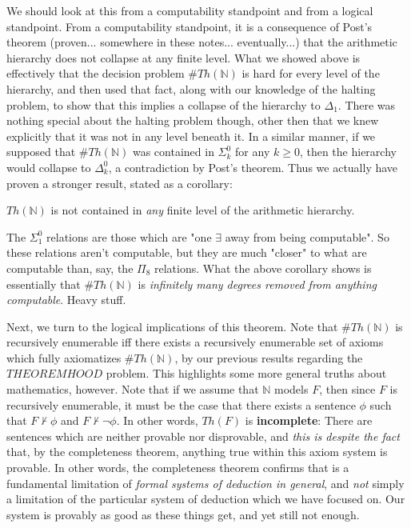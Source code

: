 We should look at this from a computability standpoint and from a logical standpoint. From a computability standpoint, it is a consequence of Post's theorem (proven... somewhere in these notes... eventually...) that the arithmetic hierarchy does not collapse at any finite level. What we showed above is effectively that the decision problem $\#Th({\mathbb{N}})$ is hard for every level of the hierarchy, and then used that fact, along with our knowledge of the halting problem, to show that this implies a collapse of the hierarchy to $\Delta_1$. There was nothing special about the halting problem though, other then that we knew explicitly that it was not in any level beneath it. In a similar manner, if we supposed that $\#Th({\mathbb{N}})$ was contained in $\Sigma^0_k$ for any $k \geq 0$, then the hierarchy would collapse to $\Delta^0_k$, a contradiction by Post's theorem. Thus we actually have proven a stronger result, stated as a corollary:
\begin{corollary}
    $Th({\mathbb{N}})$ is not contained in \textit{any} finite level of the arithmetic hierarchy.
\end{corollary}
The $\Sigma^0_1$ relations are those which are "one $\exists$ away from being computable". So these relations aren't computable, but they are much "closer" to what are computable than, say, the $\Pi_8$ relations. What the above corollary shows is essentially that $\#Th({\mathbb{N}})$ is \textit{infinitely many degrees removed from anything computable}. Heavy stuff. \\
\par Next, we turn to the logical implications of this theorem. Note that $\#Th(\mathbb{N})$ is recursively enumerable iff there exists a recursively enumerable set of axioms which fully axiomatizes $\#Th(\mathbb{N})$, by our previous results regarding the $THEOREMHOOD$ problem. This highlights some more general truths about mathematics, however. Note that if we assume that $\mathbb{N}$ models $F$, then since $F$ is recursively enumerable, it must be the case that there exists a sentence $\phi$ such that $F \nvdash \phi$ and $F \nvdash \neg \phi$. In other words, $Th(F)$ is \textbf{incomplete}: There are sentences which are neither provable nor disprovable, and \textit{this is despite the fact} that, by the completeness theorem, anything true within this axiom system is provable. In other words, the completeness theorem confirms that is a fundamental limitation of \textit{formal systems of deduction in general}, and \textit{not} simply a limitation of the particular system of deduction which we have focused on. Our system is provably as good as these things get, and yet still not enough.
